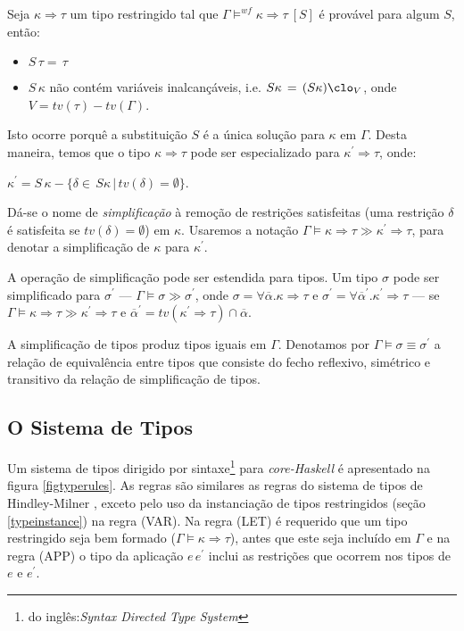 Seja $\kappa\Rightarrow\tau$ um tipo restringido tal que $\Gamma \models^{wf} \kappa\Rightarrow\tau\:[S]$ \'e prov\'avel
para algum $S$, ent\~ao: 
\begin{itemize}
	\item $S\,\tau=\,\tau$
	\item $S\,\kappa$ n\~ao cont\'em vari\'aveis inalcan\c{c}\'aveis, i.e. $S\kappa\,=\,(S\kappa)\clo_{V}$, 
	      onde $V=tv(\tau)- tv(\Gamma)$.
\end{itemize}
Isto ocorre porqu\^e a substitui\c{c}\~ao $S$ \'e a \'unica solu\c{c}\~ao para $\kappa$ em $\Gamma$. Desta maneira, 
temos que o tipo $\kappa\Rightarrow\tau$ pode ser especializado para 
$\kappa^{\prime}\Rightarrow\tau$, onde:
\begin{center}
 $\kappa^{\prime}=S\,\kappa-\{\delta\in\,S\kappa\,|\,tv(\delta)=\emptyset\}$.
\end{center}
D\'a-se o nome de \emph{simplifica\c{c}\~ao} \`a remo\c{c}\~ao de restri\c{c}\~oes satisfeitas 
(uma restri\c{c}\~ao $\delta$ \'e satisfeita se $tv(\delta)=\emptyset$) em $\kappa$. Usaremos a nota\c{c}\~ao
$\Gamma\models\kappa\Rightarrow\tau\gg\kappa^{\prime}\Rightarrow\tau$, para denotar a simplifica\c{c}\~ao de $\kappa$
para $\kappa^{\prime}$.

A opera\c{c}\~ao de simplifica\c{c}\~ao pode ser estendida para tipos. Um tipo $\sigma$ pode ser simplificado para 
$\sigma^{\prime}$ --- $\Gamma\models\sigma\gg\sigma^{\prime}$, 
onde $\sigma=\forall\overline{\alpha}.\kappa\Rightarrow\tau$ e
$\sigma^{\prime}=\forall\overline{\alpha}^{\prime}.\kappa^{\prime}\Rightarrow\tau$ --- se 
$\Gamma\models\kappa\Rightarrow\tau\gg\kappa^{\prime}\Rightarrow\tau$ e 
$\overline{\alpha}^{\prime}=tv(\kappa^{\prime}\Rightarrow\tau)\cap\overline{\alpha}$.

A simplifica\c{c}\~ao de tipos produz tipos iguais em $\Gamma$. Denotamos por 
$\Gamma\models\sigma\equiv\sigma^{\prime}$ a rela\c{c}\~ao de equival\^encia entre tipos que consiste do fecho 
reflexivo, sim\'etrico e transitivo da rela\c{c}\~ao de simplifica\c{c}\~ao de tipos.  

\subsection{O Sistema de Tipos}\label{typerules}

Um sistema de tipos dirigido por sintaxe\footnote{do ingl\^es:\emph{Syntax Directed Type System}} para 
\emph{core-Haskell} \'e apresentado na figura \ref{figtyperules}. As regras s\~ao similares as regras do
sistema de tipos de Hindley-Milner \cite{Milner79}, exceto pelo uso da instancia\c{c}\~ao de tipos restringidos  
(se\c{c}\~ao \ref{typeinstance}) na regra (VAR). Na regra (LET) \'e requerido que um tipo restringido 
seja bem formado ($\Gamma\models\kappa\Rightarrow\tau$), antes que este seja inclu\'ido em $\Gamma$ e na regra (APP)
o tipo da aplica\c{c}\~ao $e\,e^{\prime}$ inclui as restri\c{c}\~oes que ocorrem nos tipos de $e$ e $e^{\prime}$. 

